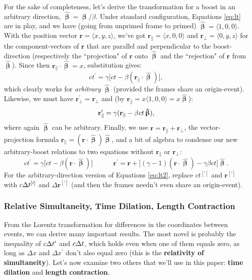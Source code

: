\documentclass[12pt]{article}
\renewcommand{\vv}[1]{\mathbf{#1}}
\newcommand{\vvbeta}{\bm{\upbeta}}
\newcommand{\hatbeta}{\bm{\hat{\upbeta}}}
\begin{document}
For the sake of completeness, let's derive the transformation for a boost in an arbitrary direction, $\hatbeta = \vvbeta / \beta$. Under standard configuration, Equations \ref{eq:lt} are in play, and we have (going from unprimed frame to primed) ${ \hatbeta = \langle 1, 0, 0 \rangle }$. With the position vector $\vv r = \langle x, y, z \rangle$, we've got ${ \vv r _\parallel = \langle x, 0, 0 \rangle }$ and ${\vv r _\perp = \langle 0, y, z \rangle}$ for the component-vectors of $\vv r$ that are parallel and perpendicular to the boost-direction (respectively the ``projection" of $\vv r$ onto $\hatbeta$ and the ``rejection" of $\vv r$ from $\hatbeta$). Since then $\vv r _\parallel \cdot \hatbeta = x$, substitution gives:
\begin{equation*}
c t^{\prime} = \gamma \big[ c t - \beta (\vv r _\parallel \cdot \hatbeta ) \big],
\end{equation*}
which clearly works for \emph{arbitrary} $\hatbeta$ (provided the frames share an origin-event). Likewise, we must have $\vv r^{\prime} _\perp = \vv r _\perp$ and (by $\vv r _\parallel = x \langle 1, 0, 0 \rangle = x \hatbeta$):
\begin{equation*}
\vv r^{\prime} _\parallel = \gamma ( \vv r _\parallel - \beta \mkern1mu c t \, \hatbeta ),
\end{equation*}
where again $\hatbeta$ can be arbitrary. Finally, we use $\vv r = \vv r _\parallel + \vv r _\perp$, the vector-projection formula $\vv r _\parallel = (\vv r \cdot \hatbeta) \hatbeta$, and a bit of algebra to condense our new arbitrary-boost relations to two equations without $\vv r _\parallel$ or $\vv r _\perp$:
\begin{equation}\label{eq:lt3}
c t^{\prime} = \gamma \big[ c t - \beta ( \vv r \cdot \hatbeta ) \big] \qquad \quad
\vv r^{\prime} = \vv r + \big[ (\gamma - 1)(\vv r \cdot \hatbeta) - \gamma \beta c t \big] \hatbeta .
\end{equation}
For the arbitrary-direction version of Equations \ref{eq:lt2}, replace $ct^{[\prime]}$ and $\vv r^{[\prime]}$ with $c \mkern.5mu \Delta t^{[\prime]}$ and $\Delta \vv r^{[\prime]}$ (and then the frames needn't even share an origin-event).


\subsubsection{Relative Simultaneity, Time Dilation, Length Contraction}\label{sssec:td}

From the Lorentz transformation for differences in the coordinates between events, we can derive many important results. The most novel is probably the inequality of $c \mkern.5mu \Delta t^{\prime}$ and $c \mkern.5mu \Delta t$, which holds even when one of them equals zero, as long as $\Delta x$ and $\Delta x^\prime$ don't also equal zero (this is the \textbf{relativity of simultaneity}). Let's now examine two others that we'll use in this paper: \textbf{time dilation} and \textbf{length contraction}.
\end{document}
